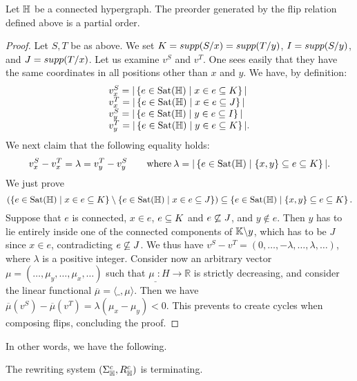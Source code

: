 \begin{proposition} 
\label{flip-partial-order}
Let ${\mathbb H}$ be a connected hypergraph. The preorder generated by the flip relation defined above is a partial order.
\end{proposition}
\begin{proof}
Let $S,T$ be as above. We set $K={supp}(S/x)={supp}(T/y)$, $I={supp}(S/y)$, and $J={supp}(T/x)$.
Let us examine $v^S$ and $v^T$. One sees easily that they have the same coordinates in all positions other than $x$ and  $y$. We have, by definition:
$$\begin{array}{l}
v^S_x  = |\left\{e\in{\operatorname{Sat}}({\mathbb H}) \mid x\in e\subseteq K\right\}|\\
v^T_x  = |\left\{e\in{\operatorname{Sat}}({\mathbb H}) \mid x\in e\subseteq J\right\}|\\ 
v^S_y  = |\left\{e\in{\operatorname{Sat}}({\mathbb H}) \mid y\in e\subseteq I\right\}|\\
v^T_y  = |\left\{e\in{\operatorname{Sat}}({\mathbb H}) \mid y\in e\subseteq K\right\}|.
\end{array}$$
We next claim that the following equality holds:
$$v^S_x  - v^T_x  = \lambda = 
v^T_y - v^S_y \quad\quad\textrm{where}\: \lambda= |\left\{e\in{\operatorname{Sat}}({\mathbb H}) \mid \left\{x,y\right\}\subseteq e\subseteq K\right\}|.$$
We just prove 
$$(\left\{e\in{\operatorname{Sat}}({\mathbb H}) \mid x\in e\subseteq K\right\}\setminus\left\{e\in{\operatorname{Sat}}({\mathbb H}) \mid x\in e\subseteq J\right\})\subseteq\left\{e\in{\operatorname{Sat}}({\mathbb H}) \mid \left\{x,y\right\}\subseteq e\subseteq K\right\}.$$
Suppose that $e$ is connected, $x\in e$, $e\subseteq K$ and $e\not\subseteq J$, and $y\not\in e$. Then $y$ has to lie entirely inside one of the connected components of ${\mathbb K}\backslash y$, which has to be $J$ since $x\in e$, contradicting $e\not\subseteq J$.
We thus have 
$v^S - v^T = (0,\ldots,-\lambda,…,\lambda,\ldots)$, where $\lambda$ is a positive integer.
Consider now an arbitrary vector $\mu=(\ldots,\mu_y,\ldots,\mu_x,\ldots)$ such that $\mu_{\_}:H\rightarrow\mathbb{R}$ is strictly decreasing, and consider the linear functional $\overline{\mu}=\langle\_,\mu\rangle$. 
Then we have 
$\overline{\mu}(v^S)- \overline{\mu}(v^T)=\lambda(\mu_x-\mu_y)<0$. This prevents to create cycles when composing flips, concluding the proof.
\end{proof}

In other words, we have the following.

\begin{corollary}
  The rewriting system $(\Sigma_{\mathbb H}^c,R_{\mathbb H}^c)$ is terminating.
\end{corollary}

